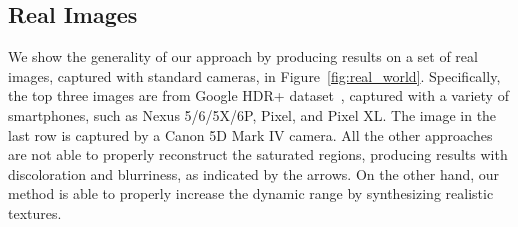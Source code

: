 \subsection{Real Images}
We show the generality of our approach by producing results on a set of real images, captured with standard cameras, in Figure~\ref{fig:real_world}. Specifically, the top three images are from Google HDR+ dataset~\cite{hasinoff2016burst}, captured with a variety of smartphones, such as Nexus 5/6/5X/6P, Pixel, and Pixel XL. The image in the last row is captured by a Canon 5D Mark IV camera. All the other approaches are not able to properly reconstruct the saturated regions, producing results with discoloration and blurriness, as indicated by the arrows. On the other hand, our method is able to properly increase the dynamic range by synthesizing realistic textures.













